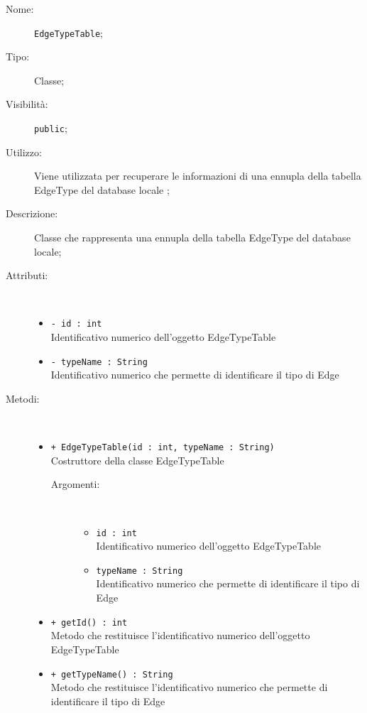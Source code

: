 \documentclass[../DefinizioneDiProdotto.tex]{subfiles}
\begin{document}
\begin{description}
	\item[Nome:] \texttt{EdgeTypeTable};
	\item[Tipo:] Classe;
	\item[Visibilità:] \texttt{public};
	\item[Utilizzo:] Viene utilizzata per recuperare le informazioni di una ennupla della tabella EdgeType del database locale ;
	\item[Descrizione:] Classe che rappresenta una ennupla della tabella EdgeType del database locale;
	\item[Attributi:] \
	\begin{itemize}
		\item \texttt{- id : int}\\
		Identificativo numerico dell'oggetto EdgeTypeTable
		
		\item \texttt{- typeName : String}\\
		Identificativo numerico che permette di identificare il tipo di Edge
		
	\end{itemize}
	\item[Metodi:] \
	\begin{itemize}
		\item \texttt{+ EdgeTypeTable(id : int, typeName : String)}\\
		Costruttore della classe EdgeTypeTable
		\begin{description}
			\item[Argomenti:] \
			\begin{itemize}
				\item \texttt{id : int}\\
				Identificativo numerico dell'oggetto EdgeTypeTable\item \texttt{typeName : String}\\
				Identificativo numerico che permette di identificare il tipo di Edge\end{itemize}
		\end{description}
		\item \texttt{+ getId() : int}\\
		Metodo che restituisce l'identificativo numerico dell'oggetto EdgeTypeTable
		\item \texttt{+ getTypeName() : String}\\
		Metodo che restituisce l'identificativo numerico che permette di identificare il tipo di Edge
	\end{itemize}
\end{description}
\end{document}
